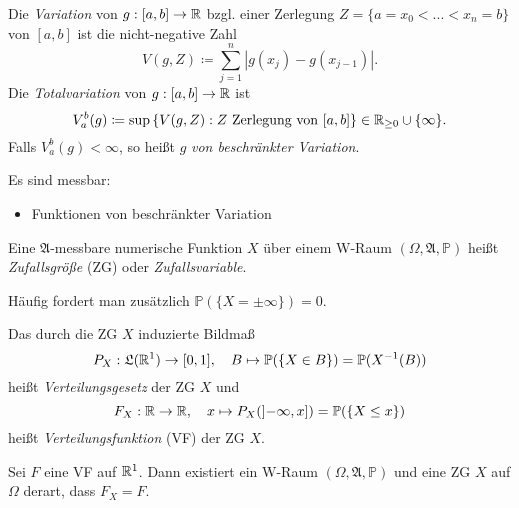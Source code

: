 \documentclass{cheat-sheet}
\newcommand{\Alg}{\mathfrak{A}} %
\newcommand{\LebAlg}{\mathfrak{L}} %
\renewcommand{\P}{\mathbb{P}} %
\begin{document}
\begin{defn}
Die \emph{Variation} von $g : [a, b] \to \mathbb{R}$ bzgl. einer Zerlegung $Z = \{ a = x_0 < ... < x_n = b \}$ von $[a, b]$ ist die nicht-negative Zahl
\[ V(g, Z) \coloneqq \sum_{j=1}^{n} |g(x_j) - g(x_{j-1})|. \]
Die \emph{Totalvariation} von $g : [a, b] \to \mathbb{R}$ ist
\[ V_a^b(g) \coloneqq \sup\left\{ V(g, Z) : Z \text{ Zerlegung von } [a, b] \right\} \in \mathbb{R}_{\ge 0} \cup \{ \infty \}. \]
Falls $V_a^b(g) < \infty$, so heißt $g$ \emph{von beschränkter Variation}.
\end{defn}

\begin{satz}
  Es sind messbar:
  \begin{itemize}
    \item Funktionen von beschränkter Variation
  \end{itemize}
\end{satz}

\begin{defn}
  Eine $\Alg$-messbare numerische Funktion $X$ über einem W-Raum $(\Omega, \Alg, \P)$ heißt \emph{Zufallsgröße} (ZG) oder \emph{Zufallsvariable}.
\end{defn}


\begin{bem}
  Häufig fordert man zusätzlich $\P(\{ X = \pm \infty \}) = 0$.
\end{bem}

\begin{defn}
  Das durch die ZG $X$ induzierte Bildmaß
  \[ P_X : \LebAlg(\R^1) \to [0,1], \quad B \mapsto \P(\{ X \in B \}) = \P(X^{-1}(B)) \]
  heißt \emph{Verteilungsgesetz} der ZG $X$ und
  \[ F_X : \R \to \R, \quad x \mapsto P_X(\left]-\infty, x\right]) = \P(\{ X \leq x \}) \]
  heißt \emph{Verteilungsfunktion} (VF) der ZG $X$.
\end{defn}


\begin{satz}
  Sei $F$ eine VF auf $\mathbb{R}^1$. Dann existiert ein W-Raum $(\Omega, \Alg, \P)$ und eine ZG $X$ auf $\Omega$ derart, dass $F_X = F$.
\end{satz}
\end{document}
